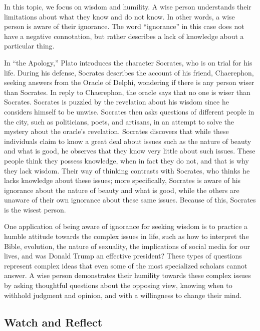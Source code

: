 \documentclass[
]{book}
\begin{document}
In this topic, we focus on wisdom and humility. A wise person understands their limitations about what they know and do not know. In other words, a wise person is aware of their ignorance. The word ``ignorance'' in this case does not have a negative connotation, but rather describes a lack of knowledge about a particular thing.

In ``the Apology,'' Plato introduces the character Socrates, who is on trial for his life. During his defense, Socrates describes the account of his friend, Chaerephon, seeking answers from the Oracle of Delphi, wondering if there is any person wiser than Socrates. In reply to Chaerephon, the oracle says that no one is wiser than Socrates. Socrates is puzzled by the revelation about his wisdom since he considers himself to be unwise. Socrates then asks questions of different people in the city, such as politicians, poets, and artisans, in an attempt to solve the mystery about the oracle's revelation. Socrates discovers that while these individuals claim to know a great deal about issues such as the nature of beauty and what is good, he observes that they know very little about such issues. These people think they possess knowledge, when in fact they do not, and that is why they lack wisdom. Their way of thinking contrasts with Socrates, who thinks he lacks knowledge about these issues; more specifically, Socrates is aware of his ignorance about the nature of beauty and what is good, while the others are unaware of their own ignorance about these same issues. Because of this, Socrates is the wisest person.

One application of being aware of ignorance for seeking wisdom is to practice a humble attitude towards the complex issues in life, such as how to interpret the Bible, evolution, the nature of sexuality, the implications of social media for our lives, and was Donald Trump an effective president? These types of questions represent complex ideas that even some of the most specialized scholars cannot answer. A wise person demonstrates their humility towards these complex issues by asking thoughtful questions about the opposing view, knowing when to withhold judgment and opinion, and with a willingness to change their mind.

\hypertarget{watch-and-reflect-2}{%
\subsection*{Watch and Reflect}\label{watch-and-reflect-2}}
\end{document}
